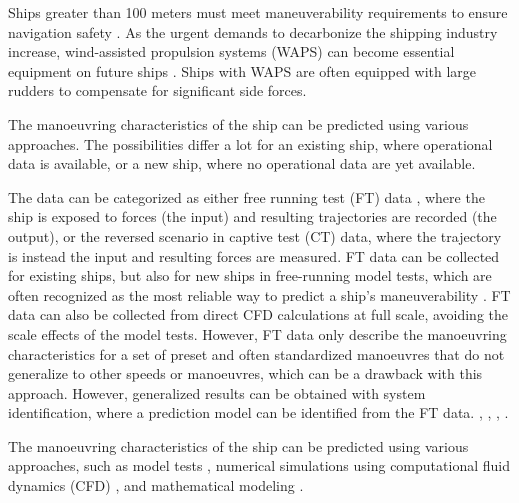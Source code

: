 Ships greater than 100 meters must meet maneuverability requirements to ensure navigation safety \citep{imoStandardsShipManoeuvrability2002}. As the urgent demands to decarbonize the shipping industry increase, wind-assisted propulsion systems (WAPS) can become essential equipment on future ships \citep{nelissenStudyAnalysisMarket2016}. Ships with WAPS are often equipped with large rudders to compensate for significant side forces. 

The manoeuvring characteristics of the ship can be predicted using various approaches. 
The possibilities differ a lot for an existing ship, where operational data is available, or a new ship, where no operational data are yet available. 

The data can be categorized as either free running test (FT) data , where the ship is exposed to forces (the input) and resulting trajectories are recorded (the output), or the reversed scenario in captive test (CT) data, where the trajectory is instead the input and resulting forces are measured.  FT data can be collected for existing ships, but also for new ships in free-running model tests, which are often recognized as the most reliable way to predict a ship's maneuverability \citep{ittcITTCRecommendedProcedures2008}.
FT data can also be collected from direct CFD calculations at full scale, avoiding the scale effects of the model tests. However, FT data only describe the manoeuvring characteristics for a set of preset and often standardized manoeuvres \citep{imoStandardsShipManoeuvrability2002} that do not generalize to other speeds or manoeuvres, which can be a drawback with this approach.
However, generalized results can be obtained with system identification, where a prediction model can be identified from the FT data. \citet{luoParameterIdentificationShip2016}, \citet{xuUncertaintyAnalysisHydrodynamic2019}, \citet{wangOptimalDesignExcitation2020}, \citet{alexanderssonSystemIdentificationVessel2022}. 


The manoeuvring characteristics of the ship can be predicted using various approaches, such as model tests \citep{ittcManeuveringCommitteeITTC2008}, numerical simulations using computational fluid dynamics (CFD) \citep{elmoctarRANSBasedSimulatedShip2014,dumanTurnZigzagManoeuvres2022}, and mathematical modeling \citep{abkowitzMEASUREMENTHYDRODYNAMICCHARACTERISTICS1980,fossenHandbookMarineCraft2011,yasukawaIntroductionMMGStandard2015,alexanderssonSystemIdentificationPhysicsinformed2024b}.

